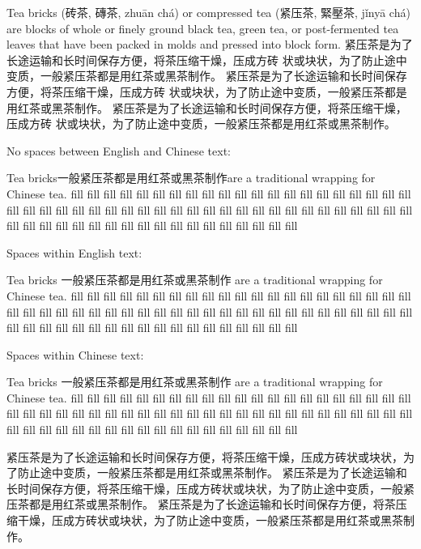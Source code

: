 \documentclass{article}
\newcommand{\cn}{\mktsFontfileSunexta\cjkgUseCjkGlue}
\begin{document}
\begin{multicols}{3}%
Tea bricks ({\cn 砖茶}, {\cn 磚茶}, zhuān chá) or compressed tea
({\cn 紧压茶}, {\cn 緊壓茶}, jǐnyā chá) are blocks of whole or finely ground black tea,
green tea, or post-fermented tea leaves that have been packed in molds and
pressed into block form. {\cn 紧压茶是为了长途运输和长时间保存方便，将茶压缩干燥，压成方砖
状或块状，为了防止途中变质，一般紧压茶都是用红茶或黑茶制作。
紧压茶是为了长途运输和长时间保存方便，将茶压缩干燥，压成方砖
状或块状，为了防止途中变质，一般紧压茶都是用红茶或黑茶制作。
紧压茶是为了长途运输和长时间保存方便，将茶压缩干燥，压成方砖
状或块状，为了防止途中变质，一般紧压茶都是用红茶或黑茶制作。}

\end{multicols}

No spaces between English and Chinese text:
\begin{multicols}{3}%
Tea bricks{\cn 一般紧压茶都是用红茶或黑茶制作}are a traditional wrapping for Chinese tea.
fill fill fill fill fill fill fill fill fill fill fill fill fill fill fill fill
fill fill fill fill fill fill fill fill fill fill fill fill fill fill fill fill
fill fill fill fill fill fill fill fill fill fill fill fill fill fill fill fill
fill fill fill fill fill fill fill fill fill fill fill fill fill fill fill fill
\end{multicols}

Spaces within English text:
\begin{multicols}{3}%
Tea bricks {\cn 一般紧压茶都是用红茶或黑茶制作} are a traditional wrapping for Chinese tea.
fill fill fill fill fill fill fill fill fill fill fill fill fill fill fill fill
fill fill fill fill fill fill fill fill fill fill fill fill fill fill fill fill
fill fill fill fill fill fill fill fill fill fill fill fill fill fill fill fill
fill fill fill fill fill fill fill fill fill fill fill fill fill fill fill fill
\end{multicols}

Spaces within Chinese text:
\begin{multicols}{3}%
Tea bricks{\cn{} 一般紧压茶都是用红茶或黑茶制作 }are a traditional wrapping for Chinese tea.
fill fill fill fill fill fill fill fill fill fill fill fill fill fill fill fill
fill fill fill fill fill fill fill fill fill fill fill fill fill fill fill fill
fill fill fill fill fill fill fill fill fill fill fill fill fill fill fill fill
fill fill fill fill fill fill fill fill fill fill fill fill fill fill fill fill
\end{multicols}



\begin{multicols}{3}%

{\cn{}紧压茶是为了长途运输和长时间保存方便，将茶压缩干燥，压成方砖状或块状，为了防止途中变质，一般紧压茶都是用红茶或黑茶制作。}%
{\cn{}紧压茶是为了长途运输和长时间保存方便，将茶压缩干燥，压成方砖状或块状，为了防止途中变质，一般紧压茶都是用红茶或黑茶制作。}%
{\cn{}紧压茶是为了长途运输和长时间保存方便，将茶压缩干燥，压成方砖状或块状，为了防止途中变质，一般紧压茶都是用红茶或黑茶制作。}

\end{multicols}
\end{document}
